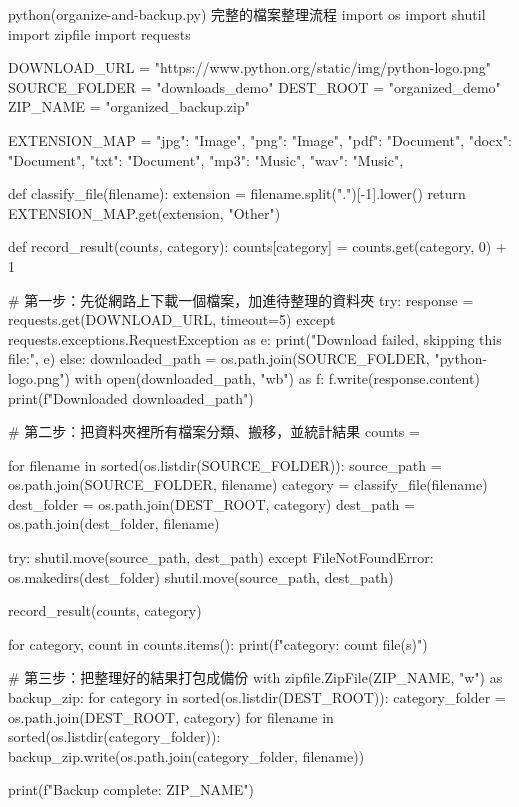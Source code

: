 \begin{example}{python}{(organize-and-backup.py) 完整的檔案整理流程}
import os
import shutil
import zipfile
import requests

DOWNLOAD_URL = "https://www.python.org/static/img/python-logo.png"
SOURCE_FOLDER = "downloads_demo"
DEST_ROOT = "organized_demo"
ZIP_NAME = "organized_backup.zip"

EXTENSION_MAP = {
    "jpg": "Image", "png": "Image",
    "pdf": "Document", "docx": "Document", "txt": "Document",
    "mp3": "Music", "wav": "Music",
}


def classify_file(filename):
    extension = filename.split(".")[-1].lower()
    return EXTENSION_MAP.get(extension, "Other")


def record_result(counts, category):
    counts[category] = counts.get(category, 0) + 1


# 第一步：先從網路上下載一個檔案，加進待整理的資料夾
try:
    response = requests.get(DOWNLOAD_URL, timeout=5)
except requests.exceptions.RequestException as e:
    print("Download failed, skipping this file:", e)
else:
    downloaded_path = os.path.join(SOURCE_FOLDER, "python-logo.png")
    with open(downloaded_path, "wb") as f:
        f.write(response.content)
    print(f"Downloaded {downloaded_path}")

# 第二步：把資料夾裡所有檔案分類、搬移，並統計結果
counts = {}

for filename in sorted(os.listdir(SOURCE_FOLDER)):
    source_path = os.path.join(SOURCE_FOLDER, filename)
    category = classify_file(filename)
    dest_folder = os.path.join(DEST_ROOT, category)
    dest_path = os.path.join(dest_folder, filename)

    try:
        shutil.move(source_path, dest_path)
    except FileNotFoundError:
        os.makedirs(dest_folder)
        shutil.move(source_path, dest_path)

    record_result(counts, category)

for category, count in counts.items():
    print(f"{category}: {count} file(s)")

# 第三步：把整理好的結果打包成備份
with zipfile.ZipFile(ZIP_NAME, "w") as backup_zip:
    for category in sorted(os.listdir(DEST_ROOT)):
        category_folder = os.path.join(DEST_ROOT, category)
        for filename in sorted(os.listdir(category_folder)):
            backup_zip.write(os.path.join(category_folder, filename))

print(f"Backup complete: {ZIP_NAME}")
\end{example}

